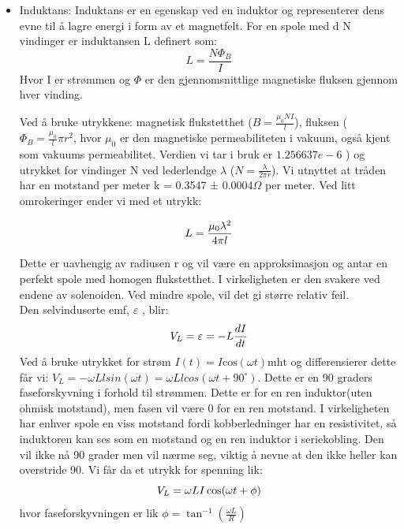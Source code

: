 \documentclass[norsk,a4paper,12pt]{article}
\begin{document}
\begin{itemize}
\item Induktans: Induktans er en egenskap ved en induktor og representerer dens evne til å lagre energi i form av et magnetfelt. For en spole med d N vindinger er induktansen L definert
som:  
\begin{equation}
L=\frac{N\Phi_{B}}{I}
\label{eq: Induktans}
\end{equation}
Hvor I er strømmen og $\Phi$ er den gjennomsnittlige magnetiske fluksen gjennom hver vinding. 

Ved å bruke utrykkene: magnetisk flukstetthet ($B=\frac{\mu_0NI}l$), fluksen ($\Phi_B=\frac{\mu_0}l\pi r^2$, hvor $\mu_0$ er den magnetiske permeabiliteten i vakuum, også kjent som vakuums permeabilitet. Verdien vi tar i bruk er $1.256637e-6$ ) og utrykket for vindinger N ved lederlendge $\lambda$ ($N=\frac\lambda{2\pi r}$). Vi utnyttet at tråden har en motstand per meter k =
0.3547 ± 0.0004$\Omega$ per meter. Ved litt omrokeringer ender vi med et utrykk: 

\begin{equation}
L=\frac{\mu_{0}\lambda^{2}}{4\pi l}\\
\label{eq: induktansen}
\end{equation}

Dette er uavhengig av radiusen r og vil være en approksimasjon og antar en perfekt spole med homogen flukstetthet.  I virkeligheten er den svakere ved endene av solenoiden. Ved mindre spole, vil det gi større relativ feil. \\

Den selvinduserte emf, $\varepsilon$ , blir:
\begin{equation}
V_L = \varepsilon=-L\frac{dI}{dt}\\
\label{eq: emf}
\end{equation}
Ved å bruke utrykket for strøm $I(t)=I\mathrm{cos}(\omega t)\mathrm{mht}$ og differensierer dette får vi: $V_L=-\omega Llsin(\omega t)=\omega Llcos(\omega t+90^\circ)$. Dette er en 90 graders faseforskyvning i forhold til strømmen. Dette er for en ren induktor(uten ohmisk motstand), men fasen vil være 0 for en ren motstand. I virkeligheten har enhver spole en viss motstand fordi kobberledninger har en resistivitet, så induktoren kan ses som en motstand og en ren induktor i seriekobling. Den vil ikke nå 90 grader men vil nærme seg, viktig å nevne at den ikke heller kan overstride 90. Vi får da et utrykk for spenning lik: 
\begin{equation}
V_L=\omega LI\cos(\omega t+\phi)\\
\label{eq: }
\end{equation}
hvor faseforskyvningen er lik $\phi=\tan^{-1}(\frac{\omega L}R)$



\end{itemize}
\end{document}
